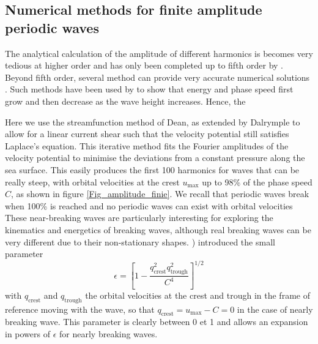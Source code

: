 \subsection{Numerical methods for finite amplitude periodic waves}
The analytical calculation of the amplitude of different harmonics is becomes very tedious at higher order and has only been completed 
up to fifth order by \cite{De1955}. Beyond fifth order, several method can provide very accurate numerical solutions \citep{Dean1965,Dalrymple1974,Schwartz1974}. 
Such methods have been used by \cite{Longuet-Higgins&Fenton1974} to show that energy and phase speed first grow and then decrease as the wave height increases. Hence, the 

Here we use the streamfunction method of Dean, as extended by Dalrymple to allow for a linear current shear such that the velocity potential still 
satisfies Laplace's equation. This iterative method fits the Fourier amplitudes of the velocity potential to minimise the deviations from a constant pressure 
along the sea surface. This easily produces the first 100 harmonics for waves that can be really steep, with  orbital velocities at the crest 
$u_{\mathrm{max}}$ up to  98\% of the phase speed  $C$, as shown in figure \ref{Fig_amplitude_finie}. 
We recall that periodic waves break when 100\% is reached and no periodic waves can exist with orbital velocities 
These near-breaking waves are particularly interesting for exploring the kinematics and energetics of breaking waves, although 
real breaking waves can be very different due to their non-stationary shapes. 
\cite{Cokelet1977}) introduced the small parameter 
\begin{equation}
    \epsilon = \left[1 - \frac{q_{\mathrm{crest}}^2
    q_{\mathrm{trough}}^2}{C^4}\right]^{1/2}
\end{equation}
with $q_{\mathrm{crest}}$ and $q_{\mathrm{trough}}$ the orbital velocities at the crest and trough in the frame 
of reference moving with the wave, so that $q_{\mathrm{crest}}=u_{\mathrm{max}}-C=0$ in the case of nearly breaking wave. 
This parameter is clearly between 0 et 1 and allows an expansion in powers of  $\epsilon$ for nearly breaking waves. 


